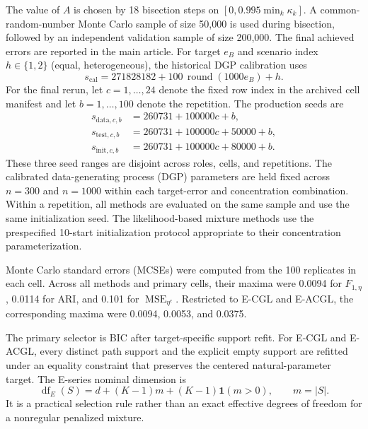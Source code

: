 \documentclass[preprint,12pt,authoryear]{elsarticle}
\begin{document}
The value of $A$ is chosen by 18 bisection steps on
$[0,0.995\min_k\kappa_k]$. A common-random-number Monte Carlo sample of size
50,000 is used during bisection, followed by an independent validation sample
of size 200,000. The final achieved errors are reported in the main article.
For target $e_B$ and scenario index $h\in\{1,2\}$ (equal, heterogeneous), the
historical DGP calibration uses
\[
s_{\mathrm{cal}}
=271828182+100\,\operatorname{round}(1000e_B)+h.
\]
For the final rerun, let $c=1,\ldots,24$ denote the fixed row index in the
archived cell manifest and let $b=1,\ldots,100$ denote the repetition. The
production seeds are
\[
\begin{aligned}
s_{\mathrm{data},c,b}&=260731+100000c+b,\\
s_{\mathrm{test},c,b}&=260731+100000c+50000+b,\\
s_{\mathrm{init},c,b}&=260731+100000c+80000+b.
\end{aligned}
\]
These three seed ranges are disjoint across roles, cells, and repetitions.
The calibrated data-generating process (DGP) parameters are held fixed across
$n=300$ and $n=1000$ within each target-error and concentration combination.
Within a repetition, all methods are evaluated on the same sample and use the
same initialization seed. The likelihood-based mixture methods use the
prespecified 10-start initialization protocol appropriate to their
concentration parameterization.

Monte Carlo standard errors (MCSEs) were computed from the 100 replicates in each
cell. Across all methods and primary cells,
their maxima were 0.0094 for $F_{1,\eta}$, 0.0114 for ARI, and 0.101 for
$\operatorname{MSE}_{\eta^c}$. Restricted to E-CGL and E-ACGL, the
corresponding maxima were 0.0094,
0.0053, and 0.0375.

The primary selector is BIC after target-specific support refit. For E-CGL and
E-ACGL, every distinct path support and the explicit empty support are refitted
under an equality constraint that preserves the centered natural-parameter
target. The E-series nominal dimension is
\begin{equation}
\label{eq:supp-df-e}
\operatorname{df}_{E}(S)
=d+(K-1)m+(K-1)\mathbf 1(m>0),
\qquad m=|S|.
\end{equation}
It is a practical selection rule rather than an exact effective degrees of
freedom for a nonregular penalized mixture.
\end{document}
